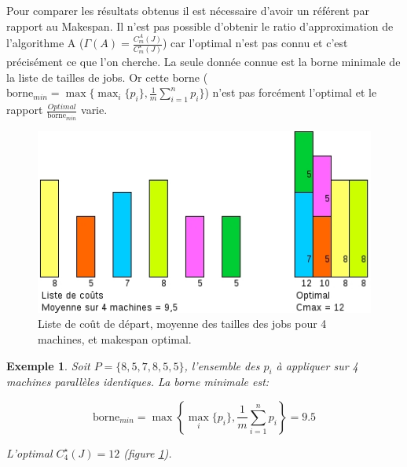 \documentclass[a4paper,12pt]{report}
\theoremstyle{plain}				%
\newtheorem{example}{Exemple}
\theoremstyle{definition}				%
\begin{document}
Pour comparer les résultats obtenus il est nécessaire d'avoir un référent par rapport au Makespan. 
Il n'est pas possible d'obtenir le ratio d'approximation de l'algorithme A ($\Gamma(A)=\frac{C_m^A(J)}{C_m^\star(J)}$) car l'optimal n'est pas connu et c'est précisément ce que l'on cherche. 
La seule donnée connue est la borne minimale de la liste de tailles de jobs.
Or cette borne ($\text{borne}_{min} = \max \{ \max_i\{p_i\}, \frac{1}{m} \sum_{i=1}^{n} p_i \}$) n'est pas forcément l'optimal et le rapport $\frac{Optimal}{\text{borne}_{min}}$ varie.

\bigskip

\begin{figure}
{\centering
\includegraphics[width=\columnwidth]{MoyenneVsOptimal.jpg}
\caption{Liste de coût de départ, moyenne des tailles des jobs pour 4 machines, et makespan optimal.}
\label{ex:borneMinVSOptimalListeDepart}
\par}
\end{figure}

\begin{example}
Soit $P=\{8, 5, 7, 8, 5, 5\}$, l'ensemble des $p_i$ à appliquer sur 4 machines parallèles identiques.
La borne minimale est:


$$\text{borne}_{min} = \max \left\{ \max_i\{p_i\}, \frac{1}{m} \sum_{i=1}^{n} p_i \right\} = 9.5$$


L'optimal $C_4^\star(J) = 12$ (figure \ref{ex:borneMinVSOptimalListeDepart}).
\end{example}
\end{document}
